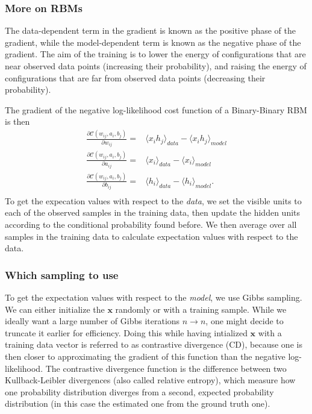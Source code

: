 \documentclass{beamer}
\begin{document}
\begin{frame}
\frametitle{More on RBMs}

The data-dependent term in the gradient is known as the positive phase of the gradient, while the model-dependent term is known as the negative phase of the gradient. The aim of the training is to lower the energy of configurations that are near observed data points (increasing their probability), and raising the energy of configurations that are far from observed data points (decreasing their probability).

The gradient of the negative log-likelihood cost function of a Binary-Binary RBM is then
\begin{align}
	\frac{\partial \mathcal{C} (w_{ij}, a_i, b_j)}{\partial w_{ij}} =& \langle x_i h_j \rangle_{data} - \langle x_i h_j \rangle_{model} \\
	\frac{\partial \mathcal{C} (w_{ij}, a_i, b_j)}{\partial a_{ij}} =& \langle x_i \rangle_{data} - \langle x_i \rangle_{model} \\
	\frac{\partial \mathcal{C} (w_{ij}, a_i, b_j)}{\partial b_{ij}} =& \langle h_i \rangle_{data} - \langle h_i \rangle_{model}. \\
\end{align}
To get the expecation values with respect to the \emph{data}, we set the visible units to each of the observed samples in the training data, then update the hidden units according to the conditional probability found before. We then average over all samples in the training data to calculate expectation values with respect to the data.
\end{frame}

\begin{frame}
\frametitle{Which sampling to use}

To get the expectation values with respect to the \emph{model}, we use Gibbs sampling. We can either initialize the $\bm{x}$ randomly or with a training sample. While we ideally want a large number of Gibbs iterations $n\rightarrow n$, one might decide to truncate it earlier for efficiency. Doing this while having intialized $\bm{x}$ with a training data vector is referred to as contrastive divergence (CD), because one is then closer to approximating the gradient of this function than the negative log-likelihood. The contrastive divergence function is the difference between two Kullback-Leibler divergences (also called relative entropy), which measure how one probability distribution diverges from a second, expected probability distribution (in this case the estimated one from the ground truth one).
\end{frame}
\end{document}
